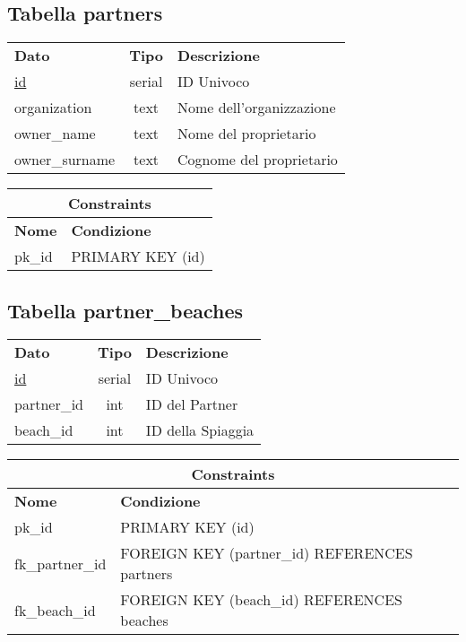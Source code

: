 \begin{center}
    \subsection*{Tabella \textnormal{partners}}
    
    \begin{tabularx}{\textwidth}{l c X}
        \toprule
        \textbf{Dato} & \textbf{Tipo} & \textbf{Descrizione}\\
        \underline{id} & serial & ID Univoco \\
        organization & text & Nome dell'organizzazione\\
        owner\_name & text & Nome del proprietario\\
        owner\_surname & text & Cognome del proprietario\\
        \midrule
    \end{tabularx}
    \begin{tabularx}{\textwidth}{l X}
        \multicolumn{2}{c}{\textbf{Constraints}}\\
        \midrule
        \textbf{Nome} & \textbf{Condizione}\\
        pk\_id & PRIMARY KEY (id)\\
        \bottomrule
    \end{tabularx}
    \bigskip
\end{center}

\begin{center}
    \subsection*{Tabella \textnormal{partner\_beaches}}
    
    \begin{tabularx}{\textwidth}{l c X}
        \toprule
        \textbf{Dato} & \textbf{Tipo} & \textbf{Descrizione}\\
        \underline{id} & serial & ID Univoco \\
        partner\_id & int & ID del Partner\\
        beach\_id & int & ID della Spiaggia\\
        \midrule
    \end{tabularx}
    \begin{tabularx}{\textwidth}{l X}
        \multicolumn{2}{c}{\textbf{Constraints}}\\
        \midrule
        \textbf{Nome} & \textbf{Condizione}\\
        pk\_id & PRIMARY KEY (id)\\
        fk\_partner\_id & FOREIGN KEY (partner\_id) REFERENCES partners\\
        fk\_beach\_id & FOREIGN KEY (beach\_id) REFERENCES beaches\\
        \bottomrule
    \end{tabularx}
    \bigskip
\end{center}

